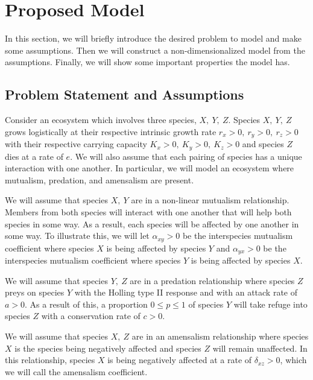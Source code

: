\documentclass[]{interact}
\theoremstyle{plain}%
\theoremstyle{definition}
\theoremstyle{remark}
\numberwithin{equation}{section}
\begin{document}
\section{Proposed Model}\label{sec:proposed-model}
In this section, we will briefly introduce the desired problem to model and make some assumptions.
Then we will construct a non-dimensionalized model from the assumptions.
Finally, we will show some important properties the model has.

\subsection{Problem Statement and Assumptions}\label{subsec:problem-statement-and-assumptions}
Consider an ecosystem which involves three species, $X,\ Y,\ Z$.
Species $X,\ Y,\ Z$ grows logistically at their respective intrinsic growth rate $r_x>0,\ r_y>0,\ r_z>0$ with their respective carrying capacity $K_x>0,\ K_y>0,\ K_z>0$ and species $Z$ dies at a rate of $e$.
We will also assume that each pairing of species has a unique interaction with one another.
In particular, we will model an ecosystem where mutualism, predation, and amensalism are present.

We will assume that species $X,\ Y$ are in a non-linear mutualism relationship.
Members from both species will interact with one another that will help both species in some way.
As a result, each species will be affected by one another in some way.
To illustrate this, we will let $\alpha_{xy}>0$ be the interspecies mutualism coefficient where species $X$ is being affected by species $Y$ and $\alpha_{yx}>0$ be the interspecies mutualism coefficient where species $Y$ is being affected by species $X$.

We will assume that species $Y,\ Z$ are in a predation relationship where species $Z$ preys on species $Y$ with the Holling type II response and with an attack rate of $a>0$.
As a result of this, a proportion $0\leq p\leq 1$ of species $Y$ will take refuge into species $Z$ with a conservation rate of $c>0$.

We will assume that species $X,\ Z$ are in an amensalism relationship where species $X$ is the species being negatively affected and species $Z$ will remain unaffected.
In this relationship, species $X$ is being negatively affected at a rate of $\delta_{xz}>0$, which we will call the amensalism coefficient.
\end{document}
